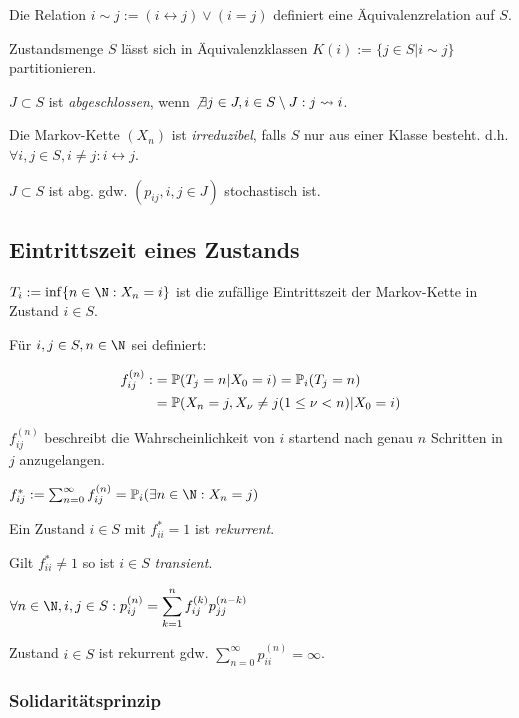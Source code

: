 Die Relation $i \sim j := (i \leftrightarrow j) \lor (i = j)$ definiert eine Äquivalenzrelation auf $S$.

Zustandsmenge $S$ lässt sich in Äquivalenzklassen $K(i) := \{j \in S | i \sim j\}$ partitionieren.

\spacing

$J \subset S$ ist \emph{abgeschlossen}, wenn $\not\exists j \in J, i \in S \setminus J : j \rightsquigarrow i$.

Die Markov-Kette $(X_n)$ ist \emph{irreduzibel}, falls $S$ nur aus einer Klasse besteht. d.h. $\forall i, j \in S, i \neq j : i \leftrightarrow j$.

\spacing

$J \subset S$ ist abg. gdw. $(p_{ij}, i,j \in J)$ stochastisch ist.

\subsection*{Eintrittszeit eines Zustands}

$T_i := \inf\{ n \in \N : X_n = i \}$ ist die zufällige Eintrittszeit der Markov-Kette in Zustand $i \in S$.

Für $i, j \in S, n \in \N$ sei definiert:

\vspace*{-4mm}
\begin{align*}
f_{ij}^{(n)} :&= \P(T_j = n | X_0 = i) = \P_i(T_j = n) \\
&= \P(X_n = j, X_\nu \neq j (1 \leq \nu < n) | X_0 = i)
\end{align*}

$f_{ij}^{(n)}$ beschreibt die Wahrscheinlichkeit von $i$ startend nach genau $n$ Schritten in $j$ anzugelangen.

$f_{ij}^* := \sum_{n=0}^\infty f_{ij}^{(n)} = \P_i(\exists n \in \N : X_n = j)$

\spacing

Ein Zustand $i \in S$ mit $f_{ii}^* = 1$ ist \emph{rekurrent}.

Gilt $f_{ii}^* \neq 1$ so ist $i \in S$ \emph{transient}.

$\forall n \in \N, i, j \in S : p_{ij}^{(n)} = \displaystyle\sum_{k=1}^n f_{ij}^{(k)} p_{jj}^{(n-k)}$

Zustand $i \in S$ ist rekurrent gdw. $\displaystyle\sum_{n = 0}^\infty p_{ii}^{(n)} = \infty$.

\subsubsection*{Solidaritätsprinzip}

